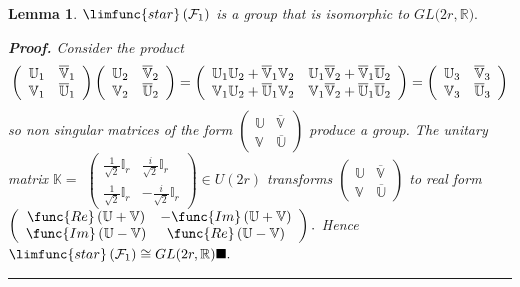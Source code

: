\documentclass[aps,preprint]{revtex4}
\newtheorem{lemma}[theorem]{Lemma}
\newenvironment{proof}[1][Proof]{\noindent\textbf{#1.} }{\ \rule{0.5em}{0.5em}}
\begin{document}
\begin{lemma}
$\limfunc{star}\left( \mathcal{F}_{1}\right) $ is a group that is isomorphic
to $GL(2r,\mathbb{R)}.$

\begin{proof}
Consider the product 
\begin{equation}
\left( 
\begin{array}{cc}
\mathbb{U}_{1} & \overline{\mathbb{V}}_{1} \\ 
\mathbb{V}_{1} & \overline{\mathbb{U}}_{1}%
\end{array}%
\right) \left( 
\begin{array}{cc}
\mathbb{U}_{2} & \overline{\mathbb{V}}_{2} \\ 
\mathbb{V}_{2} & \overline{\mathbb{U}}_{2}%
\end{array}%
\right) =\left( 
\begin{array}{cc}
\mathbb{U}_{1}\mathbb{U}_{2}+\overline{\mathbb{V}}_{1}\mathbb{V}_{2} & 
\mathbb{U}_{1}\overline{\mathbb{V}}_{2}+\overline{\mathbb{V}}_{1}\overline{%
\mathbb{U}}_{2} \\ 
\mathbb{V}_{1}\mathbb{U}_{2}+\overline{\mathbb{U}}_{1}\mathbb{V}_{2} & 
\mathbb{V}_{1}\overline{\mathbb{V}}_{2}+\overline{\mathbb{U}}_{1}\overline{%
\mathbb{U}}_{2}%
\end{array}%
\right) =\left( 
\begin{array}{cc}
\mathbb{U}_{3} & \overline{\mathbb{V}}_{3} \\ 
\mathbb{V}_{3} & \overline{\mathbb{U}}_{3}%
\end{array}%
\right)
\end{equation}%
so non singular matrices of the form $\left( 
\begin{array}{cc}
\mathbb{U} & \overline{\mathbb{V}} \\ 
\mathbb{V} & \overline{\mathbb{U}}%
\end{array}%
\right) $ produce a group. The unitary matrix $\mathbb{K}=$ $\left( 
\begin{array}{cc}
\frac{1}{\sqrt{2}}\mathbb{I}_{r} & \frac{i}{\sqrt{2}}\mathbb{I}_{r} \\ 
\frac{1}{\sqrt{2}}\mathbb{I}_{r} & -\frac{i}{\sqrt{2}}\mathbb{I}_{r}%
\end{array}%
\right) \in U\left( 2r\right) $ transforms $\left( 
\begin{array}{cc}
\mathbb{U} & \overline{\mathbb{V}} \\ 
\mathbb{V} & \overline{\mathbb{U}}%
\end{array}%
\right) $ to real form $\left( 
\begin{array}{cc}
\func{Re}\left( \mathbb{U+V}\right) & -\func{Im}\left( \mathbb{U+V}\right)
\\ 
\func{Im}\left( \mathbb{U-V}\right) & \func{Re}\left( \mathbb{U-V}\right)%
\end{array}%
\right) .$ Hence $\limfunc{star}\left( \mathcal{F}_{1}\right) \cong GL(2r,%
\mathbb{R)\blacksquare }.$
\end{proof}
\end{lemma}
\end{document}
